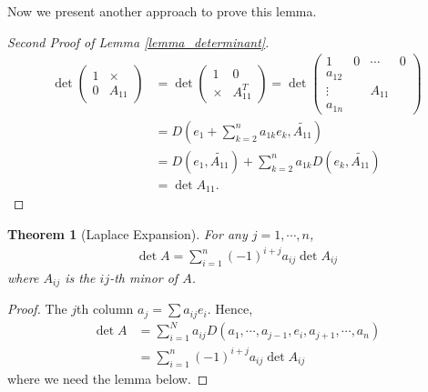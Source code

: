 \documentclass[11pt]{book}
\newtheorem{theorem}{Theorem}[section]
\theoremstyle{definition}
\numberwithin{equation}{chapter}
\begin{document}
Now we present another approach to prove this lemma.
\begin{proof}[Second Proof of Lemma \ref{lemma_determinant}]
\begin{align*}
    \det \left(
    \begin{matrix}
        1 & \times\\
        0 & A_{11}
    \end{matrix}
    \right) & = \det \left(
    \begin{matrix}
        1 & 0\\
        \times & A_{11}^T
    \end{matrix}
    \right) = \det \left(
    \begin{matrix}
        1      & 0 & \cdots & 0\\
        a_{12} &  &\\
        \vdots &  & A_{11}\\
        a_{1n}
    \end{matrix}
    \right)\\
    & = D\left(e_1 + \sum^n_{k=2}a_{1k}e_k, \widetilde{A_{11}}\right) \\
    & = D(e_1, \widetilde{A_{11}}) + \sum^n_{k=2}a_{1k} D(e_k, \widetilde{A_{11}}) \\
    & = \det A_{11}.
\end{align*}
\end{proof}

\medskip

\begin{theorem}[Laplace Expansion]\label{Laplace_Expansion_Theorem}
For any $j = 1,\cdots,n$, 
\begin{align*}
    \det A = \sum^n_{i=1}(-1)^{i+j} a_{ij} \det A_{ij}
\end{align*}
where $A_{ij}$ is the $ij$-th minor of $A$.
\end{theorem}
\begin{proof}
The $j$th column $a_j = \sum a_{ij} e_i$. Hence,
\begin{align*}
    \det A & = \sum^N_{i=1} a_{ij} D(a_1,\cdots,a_{j-1},e_i, a_{j+1},\cdots,a_n) \\
    & = \sum^n_{i=1} (-1)^{i+j} a_{ij} \det A_{ij}
\end{align*}
where we need the lemma below.
\end{proof}

\medskip
\end{document}

